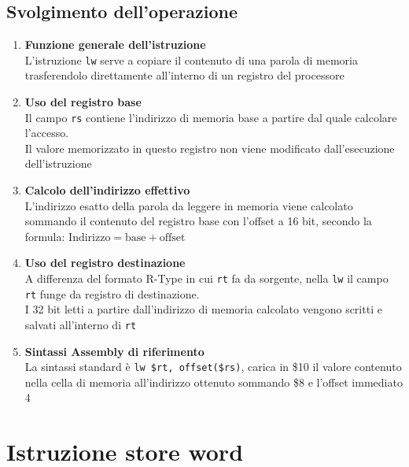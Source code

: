 \subsection{Svolgimento dell'operazione}
\begin{enumerate}
    \item \textbf{Funzione generale dell'istruzione} \\
    L'istruzione \texttt{lw} serve a copiare il contenuto di una parola di memoria trasferendolo direttamente all'interno di un registro del processore

    \item \textbf{Uso del registro base}\\
    Il campo \texttt{rs} contiene l'indirizzo di memoria base a partire dal quale calcolare l'accesso. \\
    Il valore memorizzato in questo registro non viene modificato dall'esecuzione dell'istruzione

    \item \textbf{Calcolo dell'indirizzo effettivo}\\
    L'indirizzo esatto della parola da leggere in memoria viene calcolato sommando il contenuto del registro base con l'offset a 16 bit, secondo la formula: $\text{Indirizzo} = \text{base} + \text{offset}$

    \item \textbf{Uso del registro destinazione}\\
    A differenza del formato R-Type in cui \texttt{rt} fa da sorgente, nella \texttt{lw} il campo \texttt{rt} funge da registro di destinazione.\\
    I 32 bit letti a partire dall'indirizzo di memoria calcolato vengono scritti e salvati all'interno di \texttt{rt}

    \item \textbf{Sintassi  Assembly di riferimento}\\
    La sintassi standard è \texttt{lw \$rt, offset(\$rs)}, carica in \$10 il valore contenuto nella cella di memoria all'indirizzo ottenuto sommando \$8 e l'offset immediato 4
\end{enumerate}

\newpage
\section{Istruzione store word}
